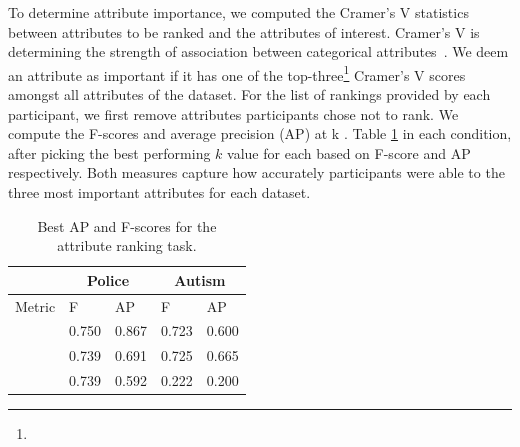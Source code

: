 To determine  attribute importance,
we computed the Cramer's V statistics
between attributes to be ranked
and the attributes of interest.
Cramer's V is 
determining
the strength of association between categorical attributes~\cite{McHugh2013}. We deem an attribute as important if it has one
of the top-three\footnote{} Cramer's V scores amongst all attributes of the dataset.
For the list of rankings provided by each participant,
we first remove attributes  participants chose not to rank.
We compute the F-scores and average precision (AP) at k
.
Table \ref{table:ranking_results}  in each condition, after picking the best performing $k$ value for each  based on F-score and AP respectively. Both measures capture how accurately participants were able to 
the three most important attributes for each dataset.
\begin{table}[ht!]
	\centering
	\vspace{-10pt}
	\begin{tabular}{l|ll|ll}
	         & \multicolumn{2}{c|}{Police}                                  & \multicolumn{2}{c}{Autism}                                   \\ \hline
	Metric   & F                             & AP                            & F                             & AP                            \\ \hline
	\system  & \cellcolor{blue!25}0.750 & \cellcolor{blue!25}0.867 & 0.723                         & 0.600                         \\
	\cluster & 0.739                         & 0.691                         & \cellcolor{blue!25}0.725 & \cellcolor{blue!25}0.665 \\
	\BFS     & 0.739                         & 0.592                         & 0.222                         & 0.200                         \\
	\end{tabular}
	\caption{Best AP and F-scores for the attribute ranking task.}
	\label{table:ranking_results}
	\vspace{-20pt}
\end{table}
